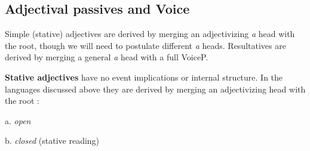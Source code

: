       \subsection{Adjectival passives and Voice}
Simple (stative) adjectives are derived by merging an adjectivizing \emph{a} head with the root, though we will need to postulate different \emph{a} heads. Resultatives are derived by merging a general \emph{a} head with a full VoiceP.

\textbf{Stative adjectives} have no event implications or internal structure. In the languages discussed above they are derived by merging an adjectivizing head with the root \citep{embick04li}:
\ex\label{ex:adj-en}
	\begin{minipage}[t]{0.3\textwidth}
		a. \emph{open}\\
	\end{minipage}
	\begin{minipage}[t]{0.3\textwidth}
		b. \emph{closed} (stative reading)\\
	\end{minipage}
\xe

